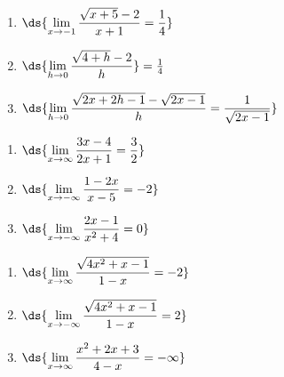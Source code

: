 \documentclass{ximera}
\begin{document}
\begin{enumerate}
\setcounter{enumi}{\value{HW}}

 \item  $\ds{ \lim_{x \rightarrow -1} \frac{\sqrt{x+5} - 2 }{x+1}  = \frac{1}{4}}$  
 
 \medskip
 
 \item $\ds{\lim_{h \rightarrow 0} \frac{\sqrt{4+h} - 2}{h}} = \frac{1}{4}$
 
 \medskip
   
 \item  $\ds{ \lim_{h \rightarrow 0} \frac{\sqrt{2x+2h-1} - \sqrt{2x-1} }{h}  = \frac{1}{\sqrt{2x-1}}}$  

\medskip

\setcounter{HW}{\value{enumi}}
\end{enumerate}

\begin{enumerate}
\setcounter{enumi}{\value{HW}}

\item  $\ds{ \lim_{x \rightarrow \infty} \frac{3x-4}{2x+1} = \frac{3}{2}}$

\medskip

\item $\ds{ \lim_{x \rightarrow -\infty}  \frac{1-2x}{x-5} = -2}$ 

\medskip

\item $\ds{ \lim_{x \rightarrow -\infty}\frac{2x-1}{x^2+4} = 0}$

\medskip

\setcounter{HW}{\value{enumi}}
\end{enumerate}

\begin{enumerate}
\setcounter{enumi}{\value{HW}}
\item $\ds{ \lim_{x \rightarrow \infty}\frac{\sqrt{4x^2+x-1}}{1-x} = -2}$

\medskip

\item $\ds{ \lim_{x \rightarrow -\infty}\frac{\sqrt{4x^2+x-1}}{1-x}  = 2}$

\medskip

\item $\ds{ \lim_{x \rightarrow \infty} \frac{x^2+2x+3}{4-x} = -\infty}$

\medskip

\setcounter{HW}{\value{enumi}}
\end{enumerate}
\end{document}
